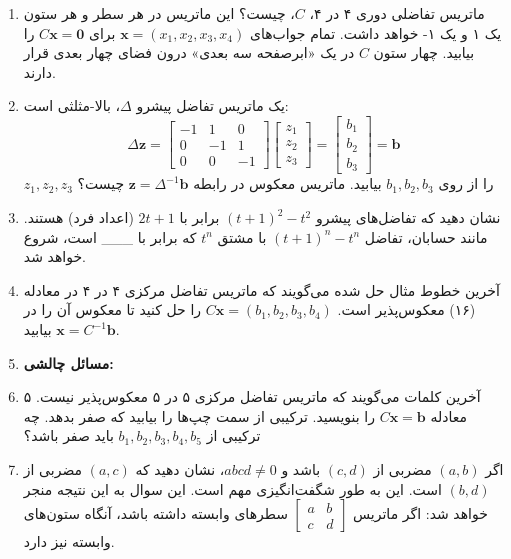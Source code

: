\documentclass[12pt, a4paper]{book}
\begin{document}
\begin{enumerate}
		\item ماتریس تفاضلی دوری ۴ در ۴، $C$، چیست؟ این ماتریس در هر سطر و هر ستون یک ۱ و یک ۱- خواهد داشت. تمام جواب‌های $\mathbf{x}=(x_1,x_2,x_3,x_4)$ برای $C\mathbf{x}=\mathbf{0}$ را بیابید. چهار ستون $C$ در یک «ابرصفحه سه بعدی» درون فضای چهار بعدی قرار دارند.
		\item یک ماتریس تفاضل پیشرو $\Delta$، بالا-مثلثی است:
		\[ \Delta \mathbf{z} = \begin{bmatrix} -1 & 1 & 0 \\ 0 & -1 & 1 \\ 0 & 0 & -1 \end{bmatrix} \begin{bmatrix} z_1 \\ z_2 \\ z_3 \end{bmatrix} = \begin{bmatrix} b_1 \\ b_2 \\ b_3 \end{bmatrix} = \mathbf{b} \]
		$z_1, z_2, z_3$ را از روی $b_1, b_2, b_3$ بیابید. ماتریس معکوس در رابطه $\mathbf{z}=\Delta^{-1}\mathbf{b}$ چیست؟
		\item نشان دهید که تفاضل‌های پیشرو $(t+1)^2-t^2$ برابر با $2t+1$ (اعداد فرد) هستند. مانند حسابان، تفاضل $(t+1)^n-t^n$ با مشتق $t^n$ که برابر با \_\_\_ است، شروع خواهد شد.
		\item آخرین خطوط مثال حل شده می‌گویند که ماتریس تفاضل مرکزی ۴ در ۴ در معادله (۱۶) معکوس‌پذیر است. $C\mathbf{x}=(b_1,b_2,b_3,b_4)$ را حل کنید تا معکوس آن را در $\mathbf{x}=C^{-1}\mathbf{b}$ بیابید.
		\item \textbf{مسائل چالشی:}
		\item آخرین کلمات می‌گویند که ماتریس تفاضل مرکزی ۵ در ۵ معکوس‌پذیر نیست. ۵ معادله $C\mathbf{x}=\mathbf{b}$ را بنویسید. ترکیبی از سمت چپ‌ها را بیابید که صفر بدهد. چه ترکیبی از $b_1, b_2, b_3, b_4, b_5$ باید صفر باشد؟
		\item اگر $(a,b)$ مضربی از $(c,d)$ باشد و $abcd \ne 0$، نشان دهید که $(a,c)$ مضربی از $(b,d)$ است. این به طور شگفت‌انگیزی مهم است. این سوال به این نتیجه منجر خواهد شد: اگر ماتریس $\begin{bmatrix} a & b \\ c & d \end{bmatrix}$ سطرهای وابسته داشته باشد، آنگاه ستون‌های وابسته نیز دارد.
	\end{enumerate}
	
\end{document}
